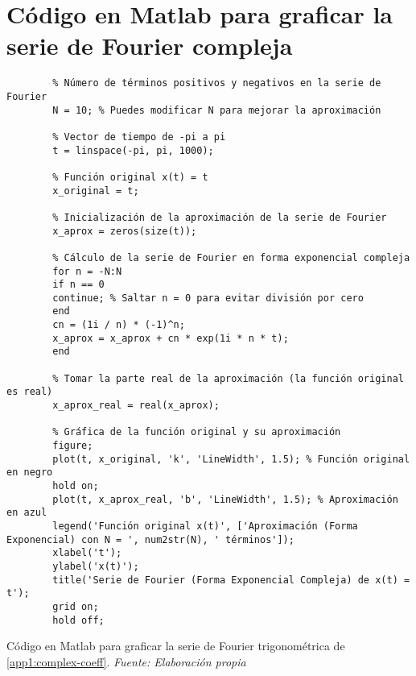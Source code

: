 \section{Código en Matlab para graficar la serie de Fourier compleja}\label{app2:complex-code-matlab}
\begin{longlisting}
	\begin{verbatim}
		% Número de términos positivos y negativos en la serie de Fourier
		N = 10; % Puedes modificar N para mejorar la aproximación
		
		% Vector de tiempo de -pi a pi
		t = linspace(-pi, pi, 1000);
		
		% Función original x(t) = t
		x_original = t;
		
		% Inicialización de la aproximación de la serie de Fourier
		x_aprox = zeros(size(t));
		
		% Cálculo de la serie de Fourier en forma exponencial compleja
		for n = -N:N
		if n == 0
		continue; % Saltar n = 0 para evitar división por cero
		end
		cn = (1i / n) * (-1)^n;
		x_aprox = x_aprox + cn * exp(1i * n * t);
		end
		
		% Tomar la parte real de la aproximación (la función original es real)
		x_aprox_real = real(x_aprox);
		
		% Gráfica de la función original y su aproximación
		figure;
		plot(t, x_original, 'k', 'LineWidth', 1.5); % Función original en negro
		hold on;
		plot(t, x_aprox_real, 'b', 'LineWidth', 1.5); % Aproximación en azul
		legend('Función original x(t)', ['Aproximación (Forma Exponencial) con N = ', num2str(N), ' términos']);
		xlabel('t');
		ylabel('x(t)');
		title('Serie de Fourier (Forma Exponencial Compleja) de x(t) = t');
		grid on;
		hold off;	
	\end{verbatim}
	\caption[Código en Matlab para graficar la serie de Fourier compleja de \ref{app1:complex-coeff}.] {Código en Matlab para graficar la serie de Fourier trigonométrica de \ref{app1:complex-coeff}. \textit{Fuente: Elaboración propia}} 
\end{longlisting}

